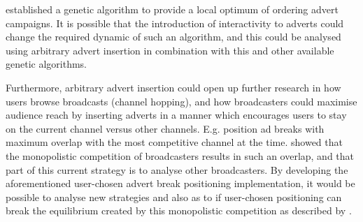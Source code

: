 	\citet{fleming2007optimal} established a genetic algorithm to provide a local optimum of ordering advert campaigns. It is possible that the introduction of interactivity to adverts could change the required dynamic of such an algorithm, and this could be analysed using arbitrary advert insertion in combination with this and other available genetic algorithms.

	Furthermore, arbitrary advert insertion could open up further research in how users browse broadcasts (channel hopping), and how broadcasters could maximise audience reach by inserting adverts in a manner which encourages users to stay on the current channel versus other channels. E.g. position ad breaks with maximum overlap with the most competitive channel at the time. \citet{epstein1998network} showed that the monopolistic competition of broadcasters results in such an overlap, and that part of this current strategy is to analyse other broadcasters. By developing the aforementioned user-chosen advert break positioning implementation, it would be possible to analyse new strategies and also as to if user-chosen positioning can break the equilibrium created by this monopolistic competition as described by \citeauthor{epstein1998network}.




